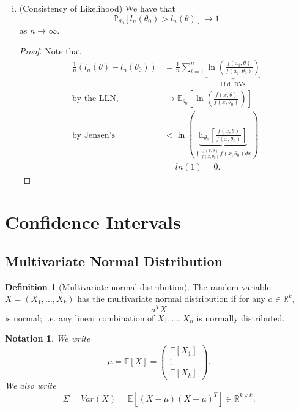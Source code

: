 \documentclass{tufte-handout}
\newcommand*\R{\mathbb{R}}
\newcommand*\E{\mathbb{E}}
\renewcommand{\P}{\mathbb{P}}
\newtheorem{notation}[thm]{Notation}
\theoremstyle{definition}
\newtheorem{defn}[thm]{Definition}
\begin{document}
\begin{enumerate}[(i)]
\begin{proof}
		(Case 2: General) Use Case 1 for $X_1 = \frac{X}{\left(\E\left[X^p\right]\right)^\frac{1}{p}}$ and $Y_1 = \frac{Y}{\left( \E\left[Y^{q}\right]  \right)^{\frac{1}{q}}}$.
	\end{proof}
	\item (Consistency of Likelihood) We have that \[
		\P_{\theta_0} \left[ l_n(\theta_0) > l_n(\theta) \right] \to 1
	\] as $n \to \infty$. 
	\begin{proof}
		Note that
		\begin{align*}
			\frac{1}{n}\left( l_n(\theta) - l_n(\theta_0) \right) &= \frac{1}{n} \sum\limits_{i=1}^{n} \underbrace{\ln{(\frac{f(x_i,\theta)}{f(x_i, \theta_0)})}}_{\text{i.i.d. RVs}} \\
			\text{by the LLN,} \quad &\to \E_{\theta_0}\left[\ln{(\frac{f(x,\theta)}{f(x,\theta_0)})}\right] \\
			\text{by Jensen's} \quad &< \ln{(\underbrace{\E_{\theta_0}\left[\frac{f(x,\theta)}{f(x,\theta_0)}\right] }_{\int_{}^{} \frac{f(x,\theta)}{f(x,\theta_0)}f(x,\theta_0)dx })} \\
									 &= ln(1) = 0
		.\end{align*}
	\end{proof}
\end{enumerate}

\section{Confidence Intervals}
\subsection{Multivariate Normal Distribution}
\begin{defn}[Multivariate normal distribution]
	The random variable $X = (X_1,\ldots,X_k)$ has the multivariate normal distribution if for any $a \in \R^k$, \[
		a^T X
	\] is normal; i.e. any linear combination of $X_1,\ldots,X_n$ is normally distributed.
\end{defn}

\begin{notation}
	We write \[
		\mu = \E\left[X\right] = \begin{pmatrix}
		\E\left[X_1\right]  \\
		\vdots \\
		\E\left[X_k\right] 
		\end{pmatrix} 
	.\] We also write \[
		\Sigma = Var(X) = \E\left[\left( X-\mu \right)\left( X-\mu \right)^T\right]  \in \R^{k\times k}
	.\] 
\end{notation}
\end{document}
